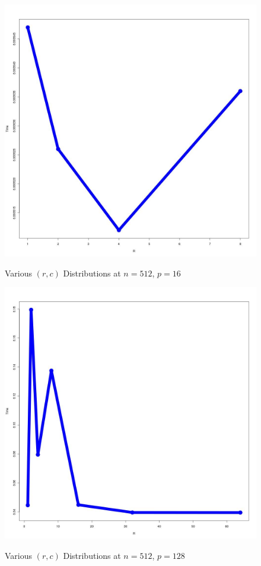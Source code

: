\documentclass[12pt]{article}
\begin{document}
\begin{figure}[H]
\centering
\caption{Various $(r, c)$ Distributions at $n=512$, $p=16$}
\includegraphics[scale=0.3]{candidate-graphs/mpi_p1_vary_process_512-16.jpg}
\label{mpi_p1_512_16}
\end{figure}

\begin{figure}[H]
\centering
\caption{Various $(r, c)$ Distributions at $n=512$, $p=128$}
\includegraphics[scale=0.3]{candidate-graphs/mpi_p1_vary_process_512-128.jpg}
\label{mpi_p1_512_128}
\end{figure}
\end{document}
